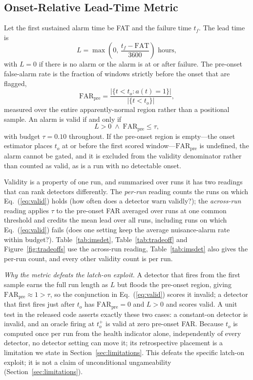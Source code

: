 \documentclass[IJPHM, 2026, 0]{PHMSociety}
\begin{document}
\subsection{Onset-Relative Lead-Time Metric}
\label{sec:metric}
Let the first sustained alarm time be FAT and the failure time $t_f$. The lead time is
\begin{equation}
L = \max\!\left(0,\, \frac{t_f - \text{FAT}}{3600}\right) \text{ hours},
\label{eq:lead}
\end{equation}
with $L=0$ if there is no alarm or the alarm is at or after failure. The pre-onset false-alarm rate is the fraction of windows strictly before the onset that are flagged,
\begin{equation}
\text{FAR}_{\text{pre}} = \frac{|\{t < t_o : a(t)=1\}|}{|\{t < t_o\}|},
\label{eq:farpre}
\end{equation}
measured over the entire apparently-normal region rather than a positional sample. An alarm is valid if and only if
\begin{equation}
L > 0 \;\wedge\; \text{FAR}_{\text{pre}} \le \tau,
\label{eq:valid}
\end{equation}
with budget $\tau=0.10$ throughout. If the pre-onset region is empty---the onset estimator places $t_o$ at or before the first scored window---$\text{FAR}_{\text{pre}}$ is undefined, the alarm cannot be gated, and it is excluded from the validity denominator rather than counted as valid, as is a run with no detectable onset.

Validity is a property of one run, and summarised over runs it has two readings that can rank detectors differently. The \emph{per-run} reading counts the runs on which Eq.~(\ref{eq:valid}) holds (how often does a detector warn validly?); the \emph{across-run} reading applies $\tau$ to the pre-onset FAR averaged over runs at one common threshold and credits the mean lead over all runs, including runs on which Eq.~(\ref{eq:valid}) fails (does one setting keep the average nuisance-alarm rate within budget?). Table~\ref{tab:imsdet}, Table~\ref{tab:tradeoff} and Figure~\ref{fig:tradeoffs} use the across-run reading, Table~\ref{tab:imsdet} also gives the per-run count, and every other validity count is per run.

\emph{Why the metric defeats the latch-on exploit.} A detector that fires from the first sample earns the full run length as $L$ but floods the pre-onset region, giving $\text{FAR}_{\text{pre}} \approx 1 > \tau$, so the conjunction in Eq.~(\ref{eq:valid}) scores it invalid; a detector that first fires just after $t_o$ has $\text{FAR}_{\text{pre}}=0$ and $L>0$ and scores valid. A unit test in the released code asserts exactly these two cases: a constant-on detector is invalid, and an oracle firing at $t_o^+$ is valid at zero pre-onset FAR. Because $t_o$ is computed once per run from the health indicator alone, independently of every detector, no detector setting can move it; its retrospective placement is a limitation we state in Section~\ref{sec:limitations}. This defeats the specific latch-on exploit; it is not a claim of unconditional ungameability (Section~\ref{sec:limitations}).
\end{document}
